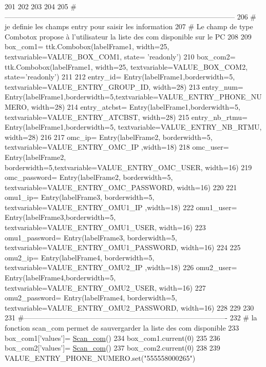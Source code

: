 \begin{DoxyCode}
201 
202 
203 
204 
205 \textcolor{comment}{#------------------------------------------------------------------------------------------------
}
206     \textcolor{comment}{# je definie les champs entry pour saisir les information
}
207     \textcolor{comment}{# Le champ de type Combotox propose à l'utilisateur la liste des com disponible sur le PC
}
208 
209     box\_com1= ttk.Combobox(labelFrame1, width=25, textvariable=VALUE\_BOX\_COM1, state= \textcolor{stringliteral}{'readonly'})
210     box\_com2= ttk.Combobox(labelFrame1, width=25, textvariable=VALUE\_BOX\_COM2, state=\textcolor{stringliteral}{'readonly'})
211 
212     entry\_id= Entry(labelFrame1,borderwidth=5, textvariable=VALUE\_ENTRY\_GROUP\_ID, width=28)
213     entry\_num= Entry(labelFrame1,borderwidth=5,textvariable=VALUE\_ENTRY\_PHONE\_NUMERO, width=28)
214     entry\_atcbst= Entry(labelFrame1,borderwidth=5, textvariable=VALUE\_ENTRY\_ATCBST, width=28)
215     entry\_nb\_rtmu= Entry(labelFrame1,borderwidth=5, textvariable=VALUE\_ENTRY\_NB\_RTMU, width=28)
216 
217     omc\_ip= Entry(labelFrame2, borderwidth=5, textvariable=VALUE\_ENTRY\_OMC\_IP ,width=18)
218     omc\_user= Entry(labelFrame2, borderwidth=5,textvariable=VALUE\_ENTRY\_OMC\_USER, width=16)
219     omc\_password= Entry(labelFrame2, borderwidth=5, textvariable=VALUE\_ENTRY\_OMC\_PASSWORD, width=16)
220 
221     omu1\_ip= Entry(labelFrame3, borderwidth=5, textvariable=VALUE\_ENTRY\_OMU1\_IP ,width=18)
222     omu1\_user= Entry(labelFrame3,borderwidth=5, textvariable=VALUE\_ENTRY\_OMU1\_USER, width=16)
223     omu1\_password= Entry(labelFrame3, borderwidth=5, textvariable=VALUE\_ENTRY\_OMU1\_PASSWORD, width=16)
224 
225     omu2\_ip= Entry(labelFrame4, borderwidth=5, textvariable=VALUE\_ENTRY\_OMU2\_IP ,width=18)
226     omu2\_user= Entry(labelFrame4,borderwidth=5, textvariable=VALUE\_ENTRY\_OMU2\_USER, width=16)
227     omu2\_password= Entry(labelFrame4, borderwidth=5, textvariable=VALUE\_ENTRY\_OMU2\_PASSWORD, width=16)
228 
229 
230 
231 \textcolor{comment}{#-------------------------------------------------------------------------------------
}
232     \textcolor{comment}{# la fonction scan\_com permet de sauvergarder la liste des com disponible
}
233     box\_com1[\textcolor{stringliteral}{'values'}]= \hyperlink{namespaceScript_1_1interfaceFrame_a76119121c3aceb43846ba3ea526623ad}{Scan\_com}()
234     box\_com1.current(0)
235 
236     box\_com2[\textcolor{stringliteral}{'values'}]= \hyperlink{namespaceScript_1_1interfaceFrame_a76119121c3aceb43846ba3ea526623ad}{Scan\_com}()
237     box\_com2.current(0)
238 
239     VALUE\_ENTRY\_PHONE\_NUMERO.set(\textcolor{stringliteral}{"555558000265"})

\end{DoxyCode}
